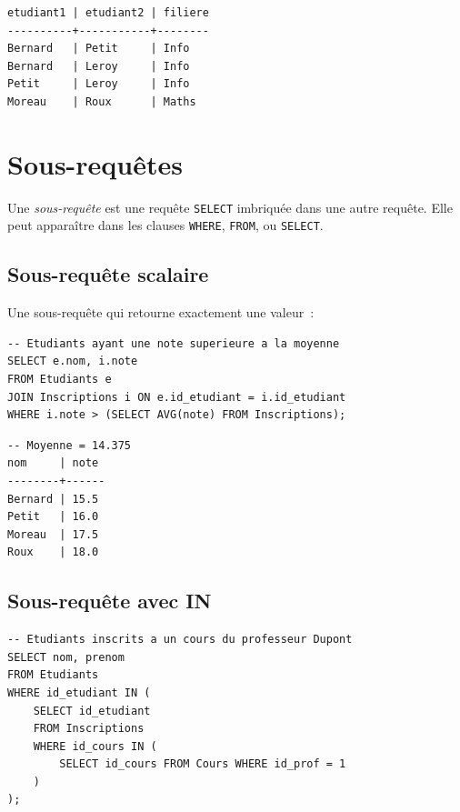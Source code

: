 \begin{codeoutput}
\begin{verbatim}
etudiant1 | etudiant2 | filiere
----------+-----------+--------
Bernard   | Petit     | Info
Bernard   | Leroy     | Info
Petit     | Leroy     | Info
Moreau    | Roux      | Maths
\end{verbatim}
\end{codeoutput}

\section{Sous-requ\^etes}

\begin{definition}
Une \emph{sous-requ\^ete} est une requ\^ete \texttt{SELECT} imbriqu\'ee
dans une autre requ\^ete. Elle peut appara\^itre dans les clauses
\texttt{WHERE}, \texttt{FROM}, ou \texttt{SELECT}.
\end{definition}

\subsection{Sous-requ\^ete scalaire}

Une sous-requ\^ete qui retourne exactement une valeur~:

\begin{codeblock}[title=\textbf{Sous-requ\^ete scalaire}]
\begin{verbatim}
-- Etudiants ayant une note superieure a la moyenne
SELECT e.nom, i.note
FROM Etudiants e
JOIN Inscriptions i ON e.id_etudiant = i.id_etudiant
WHERE i.note > (SELECT AVG(note) FROM Inscriptions);
\end{verbatim}
\end{codeblock}

\begin{codeoutput}
\begin{verbatim}
-- Moyenne = 14.375
nom     | note
--------+------
Bernard | 15.5
Petit   | 16.0
Moreau  | 17.5
Roux    | 18.0
\end{verbatim}
\end{codeoutput}

\subsection{Sous-requ\^ete avec IN}

\begin{codeblock}[title=\textbf{Sous-requ\^ete avec IN}]
\begin{verbatim}
-- Etudiants inscrits a un cours du professeur Dupont
SELECT nom, prenom
FROM Etudiants
WHERE id_etudiant IN (
    SELECT id_etudiant
    FROM Inscriptions
    WHERE id_cours IN (
        SELECT id_cours FROM Cours WHERE id_prof = 1
    )
);
\end{verbatim}
\end{codeblock}

